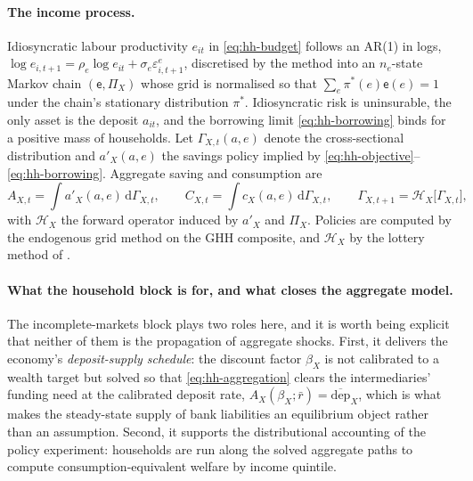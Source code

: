 \paragraph{The income process.} Idiosyncratic labour productivity $e_{it}$ in
\eqref{eq:hh-budget} follows an AR(1) in logs,
$\log e_{i,t+1}=\rho_e\log e_{it}+\sigma_e\varepsilon^{e}_{i,t+1}$, discretised by
the \citet{rouwenhorst1995} method into an $n_e$-state Markov chain
$(\mathsf{e},\Pi_X)$ whose grid is normalised so that
$\sum_e\pi^{\ast}(e)\mathsf{e}(e)=1$ under the chain's stationary distribution
$\pi^{\ast}$. Idiosyncratic risk is uninsurable, the only asset is the deposit
$a_{it}$, and the borrowing limit \eqref{eq:hh-borrowing} binds for a positive
mass of households. Let $\Gamma_{X,t}(a,e)$ denote the cross-sectional
distribution and $a'_X(a,e)$ the savings policy implied by
\eqref{eq:hh-objective}--\eqref{eq:hh-borrowing}. Aggregate saving and
consumption are
\begin{equation}
A_{X,t}=\int a'_X(a,e)\,\mathrm{d}\Gamma_{X,t},
\qquad
C_{X,t}=\int c_X(a,e)\,\mathrm{d}\Gamma_{X,t},
\qquad
\Gamma_{X,t+1}=\mathcal{H}_X\bigl[\Gamma_{X,t}\bigr],
\label{eq:hh-aggregation}
\end{equation}
with $\mathcal{H}_X$ the forward operator induced by $a'_X$ and $\Pi_X$. Policies
are computed by the endogenous grid method \citep{carroll2006method} on the GHH
composite, and $\mathcal{H}_X$ by the lottery method of
\citet{young2010solving}.

\paragraph{What the household block is for, and what closes the aggregate model.}
The incomplete-markets block plays two roles here, and it is worth being explicit
that neither of them is the propagation of aggregate shocks. First, it delivers
the economy's \emph{deposit-supply schedule}: the discount factor $\beta_X$ is
not calibrated to a wealth target but solved so that
\eqref{eq:hh-aggregation} clears the intermediaries' funding need at the
calibrated deposit rate, $A_X(\beta_X;\bar r)=\overline{\mathrm{dep}}_X$, which is
what makes the steady-state supply of bank liabilities an equilibrium object
rather than an assumption. Second, it supports the distributional accounting of
the policy experiment: households are run along the solved aggregate paths to
compute consumption-equivalent welfare by income quintile.

